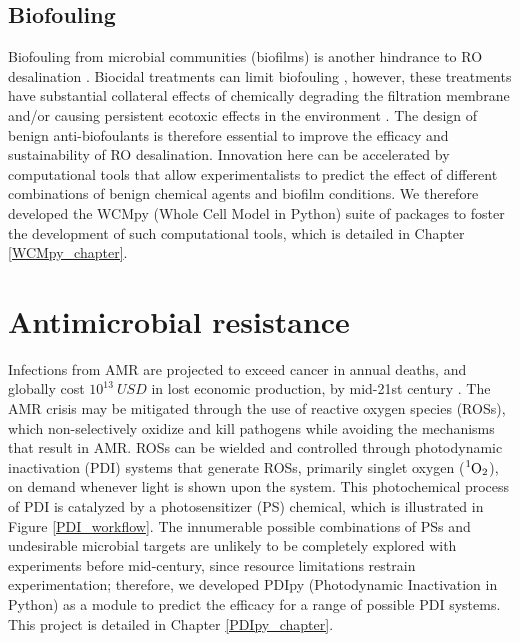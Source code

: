 \subsection{Biofouling}
Biofouling from microbial communities (biofilms) is another hindrance to RO desalination \cite{Flemming1997ReverseBiofouling,Ridgway1991BiofoulingMembranes,Ivnitsky2005CharacterizationTreatment,Herzberg2007BiofoulingPressure,Schneider2005DynamicsBiofouling,Flemming1997BiofoulingProcesses,Cantor1969BiologicalMembranes,Murphy2001MicrobiologicalMembranes,Chen2004CommunityApproach}. Biocidal treatments can limit biofouling \cite{Kim2009BiocideOverview}, however, these treatments have substantial collateral effects of chemically degrading the filtration membrane \cite{Da-Silva-Correa2022TheReview} and/or causing persistent ecotoxic effects in the environment \cite{Martins2018Review:Ecosystems,Thomas2001AntifoulingEffects}. The design of benign anti-biofoulants \cite{Buckley2017DesignProducts} is therefore essential to improve the efficacy and sustainability of RO desalination. Innovation here \cite{Winters1983ControlDesalination} can be accelerated by computational tools that allow experimentalists to predict the effect of different combinations of benign chemical agents and biofilm conditions. We therefore developed the WCMpy (Whole Cell Model in Python) suite of packages to foster the development of such computational tools, which is detailed in Chapter \ref{WCMpy_chapter}. 

\section{Antimicrobial resistance}
Infections from AMR are projected to exceed cancer in annual deaths, and globally cost $10^{13}~USD$ in lost economic production, by mid-21st century \cite{ONeill2014AntimicrobialNations}. The AMR crisis may be mitigated through the use of reactive oxygen species (ROSs), which non-selectively oxidize and kill pathogens while avoiding the mechanisms that result in AMR. ROSs can be wielded and controlled through photodynamic inactivation (PDI) systems that generate ROSs, primarily singlet oxygen ($\ce{^1O_2}$), on demand whenever light is shown upon the system. This photochemical process of PDI is catalyzed by a photosensitizer (PS) chemical, which is illustrated in Figure \ref{PDI_workflow}. The innumerable possible combinations of PSs and undesirable microbial targets are unlikely to be completely explored with experiments before mid-century, since resource limitations restrain experimentation; therefore, we developed PDIpy (Photodynamic Inactivation in Python) as a module to predict the efficacy for a range of possible PDI systems. This project is detailed in Chapter \ref{PDIpy_chapter}. 

